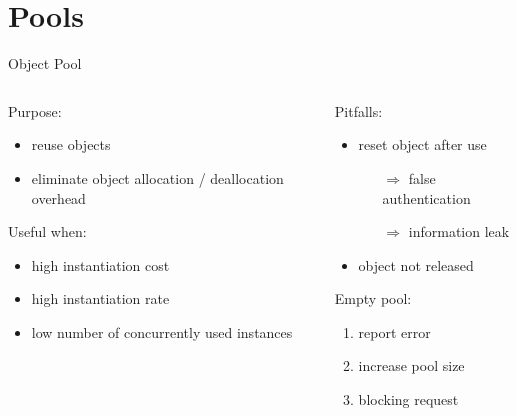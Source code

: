 \documentclass{beamer}
\begin{document}
\section{Pools}
\begin{frame}{Object Pool}
  \begin{columns}
    \begin{column}{.47\textwidth}

      \begin{block}{Purpose:}
        \begin{itemize}
          \item reuse objects
          \item eliminate object allocation / deallocation overhead
        \end{itemize}
      \end{block}

      \pause

      \begin{block}{Useful when:}
        \begin{itemize}
          \item high instantiation cost
          \item high instantiation rate
          \item low number of concurrently used instances
        \end{itemize}
      \end{block}
    \end{column}

    \pause

    \begin{column}{.47\textwidth}
      \begin{block}{Pitfalls:}
        \begin{itemize}
          \item reset object after use
            \begin{itemize}
              \item[$\Rightarrow$] false authentication
              \item[$\Rightarrow$] information leak
            \end{itemize}
          \item object not released
        \end{itemize}
      \end{block}

      \pause

      \begin{block}{Empty pool:}
        \begin{enumerate}
          \item report error
          \item increase pool size
          \item blocking request
        \end{enumerate}
      \end{block}
    \end{column}
  \end{columns}


\end{frame}
\end{document}
